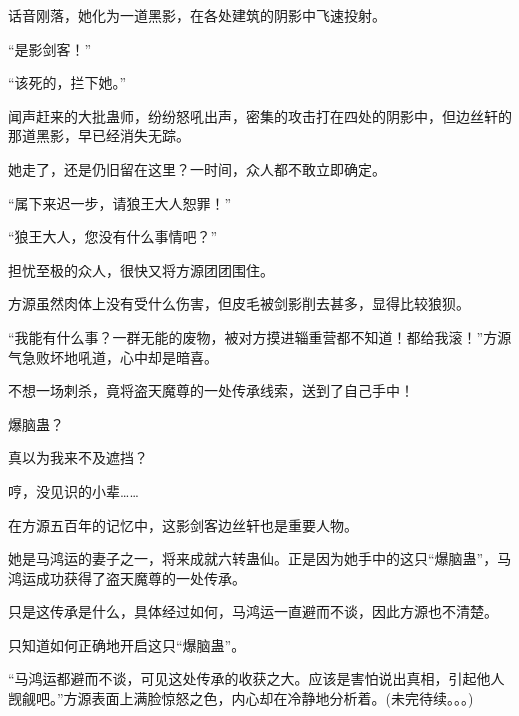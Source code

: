 \begin{this_body}
话音刚落，她化为一道黑影，在各处建筑的阴影中飞速投射。

“是影剑客！”

“该死的，拦下她。”

闻声赶来的大批蛊师，纷纷怒吼出声，密集的攻击打在四处的阴影中，但边丝轩的那道黑影，早已经消失无踪。

她走了，还是仍旧留在这里？一时间，众人都不敢立即确定。

“属下来迟一步，请狼王大人恕罪！”

“狼王大人，您没有什么事情吧？”

担忧至极的众人，很快又将方源团团围住。

方源虽然肉体上没有受什么伤害，但皮毛被剑影削去甚多，显得比较狼狈。

“我能有什么事？一群无能的废物，被对方摸进辎重营都不知道！都给我滚！”方源气急败坏地吼道，心中却是暗喜。

不想一场刺杀，竟将盗天魔尊的一处传承线索，送到了自己手中！

爆脑蛊？

真以为我来不及遮挡？

哼，没见识的小辈……

在方源五百年的记忆中，这影剑客边丝轩也是重要人物。

她是马鸿运的妻子之一，将来成就六转蛊仙。正是因为她手中的这只“爆脑蛊”，马鸿运成功获得了盗天魔尊的一处传承。

只是这传承是什么，具体经过如何，马鸿运一直避而不谈，因此方源也不清楚。

只知道如何正确地开启这只“爆脑蛊”。

“马鸿运都避而不谈，可见这处传承的收获之大。应该是害怕说出真相，引起他人觊觎吧。”方源表面上满脸惊怒之色，内心却在冷静地分析着。(未完待续。。。)

\end{this_body}

